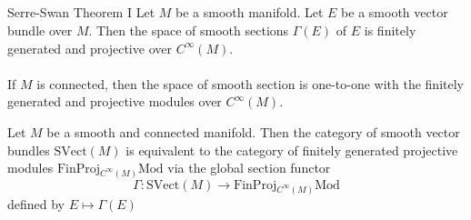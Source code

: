 \documentclass[a4paper]{article}
\begin{document}
\subsection{}
\begin{thm}{Serre-Swan Theorem I}{} Let $M$ be a smooth manifold. Let $E$ be a smooth vector bundle over $M$. Then the space of smooth sections $\Gamma(E)$ of $E$ is finitely generated and projective over $C^\infty(M)$. \\~\\

If $M$ is connected, then the space of smooth section is one-to-one with the finitely generated and projective modules over $C^\infty(M)$. 
\end{thm}

\begin{thm}{}{} Let $M$ be a smooth and connected manifold. Then the category of smooth vector bundles $\text{SVect}(M)$ is equivalent to the category of finitely generated projective modules $\text{FinProj}{_{C^\infty(M)}\text{Mod}}$ via the global section functor $$\Gamma:\text{SVect}(M)\to\text{FinProj}{_{C^\infty(M)}\text{Mod}}$$ defined by $E\mapsto\Gamma(E)$
\end{thm}

\subsection{}
\end{document}
